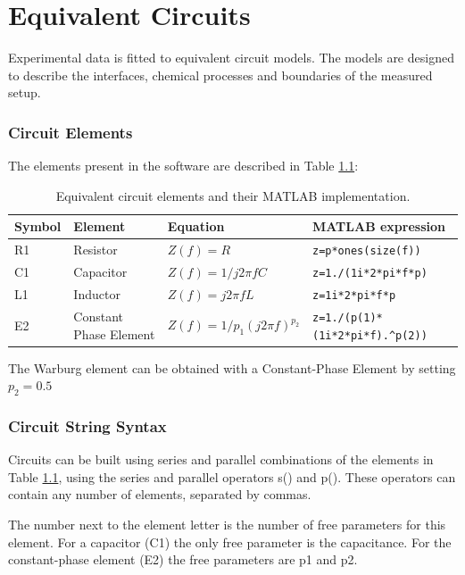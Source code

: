 \documentclass[10pt,a4paper,oneside]{book}
\begin{document}
\chapter{Equivalent Circuits}

Experimental data is fitted to equivalent circuit models. The models are designed to describe the interfaces, chemical processes and boundaries of the measured setup.

\subsection{Circuit Elements}

The elements present in the software are described in Table \ref{circelements}:

\begin{table}[h]
	\centering
	\caption{Equivalent circuit elements and their MATLAB implementation.}
	\label{circelements}
	\begin{tabular}{llll}
		\hline \textbf{Symbol} & \textbf{Element} & \textbf{Equation} & \textbf{MATLAB expression}\\
		\hline R1 & Resistor & $Z(f) = R$ & \verb|z=p*ones(size(f))| \\ 
		C1 & Capacitor & $Z(f) = 1 / j 2\pi fC$ & \verb|z=1./(1i*2*pi*f*p)| \\ 
		L1 & Inductor & $Z(f) = j 2\pi fL$  & \verb|z=1i*2*pi*f*p| \\
		E2 & Constant Phase Element & $Z(f) = 1 / p_1 (j 2 \pi f)^{p_2} $ & \verb|z=1./(p(1)*(1i*2*pi*f).^p(2))| \\
		\hline
	\end{tabular}
\end{table}

The Warburg element can be obtained with a Constant-Phase Element by setting $p_2=0.5$


\subsection{Circuit String Syntax}

Circuits can be built using series and parallel combinations of the elements in Table \ref{circelements}, using the series and parallel operators s() and p(). These operators can contain any number of elements, separated by commas.

The number next to the element letter is the number of free parameters for this element. For a capacitor (C1) the only free parameter is the capacitance. For the constant-phase element (E2) the free parameters are p1 and p2.
\end{document}
